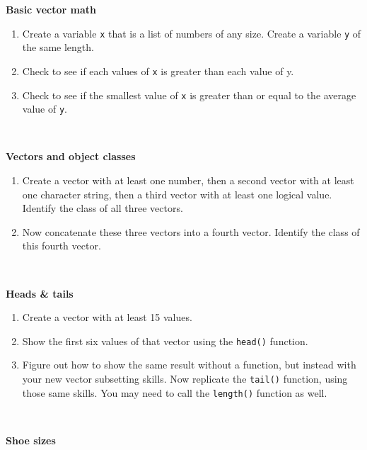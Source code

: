\documentclass[
]{book}
\begin{document}
\textbf{Basic vector math}

\begin{enumerate}
\def\labelenumi{\arabic{enumi}.}
\setcounter{enumi}{4}
\item
  Create a variable \texttt{x} that is a list of numbers of any size. Create a variable \texttt{y} of the same length.
\item
  Check to see if each values of \texttt{x} is greater than each value of y.
\item
  Check to see if the smallest value of \texttt{x} is greater than or equal to the average value of \texttt{y}.
\end{enumerate}

~

\textbf{Vectors and object classes}

\begin{enumerate}
\def\labelenumi{\arabic{enumi}.}
\setcounter{enumi}{7}
\item
  Create a vector with at least one number, then a second vector with at least one character string, then a third vector with at least one logical value. Identify the class of all three vectors.
\item
  Now concatenate these three vectors into a fourth vector. Identify the class of this fourth vector.
\end{enumerate}

~

\textbf{Heads \& tails}

\begin{enumerate}
\def\labelenumi{\arabic{enumi}.}
\setcounter{enumi}{9}
\item
  Create a vector with at least 15 values.
\item
  Show the first six values of that vector using the \texttt{head()} function.
\item
  Figure out how to show the same result without a function, but instead with your new vector subsetting skills.
  Now replicate the \texttt{tail()} function, using those same skills. You may need to call the \texttt{length()} function as well.
\end{enumerate}

~

\textbf{Shoe sizes}
\end{document}
